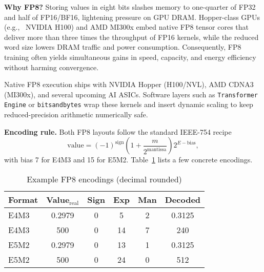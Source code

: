 \textbf{Why FP8?}  
Storing values in eight bits slashes memory to one-quarter of FP32 and half of FP16/BF16, lightening pressure on GPU DRAM. Hopper-class GPUs (e.g., \ NVIDIA H100) and AMD MI300x embed native FP8 tensor cores that deliver more than three times the throughput of FP16 kernels, while the reduced word size lowers DRAM traffic and power consumption. Consequently, FP8 training often yields simultaneous gains in speed, capacity, and energy efficiency without harming convergence.

Native FP8 execution ships with NVIDIA Hopper (H100/NVL), AMD CDNA3 (MI300x), and several upcoming AI ASICs. Software layers such as \texttt{Transformer Engine} or \texttt{bitsandbytes} wrap these kernels and insert dynamic scaling to keep reduced-precision arithmetic numerically safe.

\textbf{Encoding rule.}  
Both FP8 layouts follow the standard IEEE-754 recipe
\[
    \text{value}=(-1)^{\text{sign}}
           \left(1+\frac{m}{2^{\text{mantissa}}}\right)
           2^{E-\text{bias}},
\]
with bias 7 for E4M3 and 15 for E5M2.  Table~\ref{tab:fp8-examples} lists a few concrete encodings.

\begin{table}[h!]
\centering
\caption{Example FP8 encodings (decimal rounded)}
\label{tab:fp8-examples}
\begin{tabular}{lccccc}
\toprule
Format & Value$_\text{real}$ & Sign & Exp & Man & Decoded \\ \midrule
E4M3 & 0.2979 & 0 & 5  & 2 & 0.3125 \\
E4M3 & 500     & 0 & 14 & 7 & 240   \\
E5M2 & 0.2979 & 0 & 13 & 1 & 0.3125 \\
E5M2 & 500     & 0 & 24 & 0 & 512   \\ \bottomrule
\end{tabular}
\end{table}

